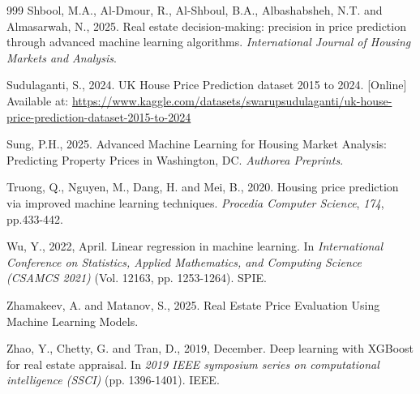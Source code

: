 \documentclass[12pt, a4paper, oneside]{book}
\begin{document}
\begin{thebibliography}{999}
Shbool, M.A., Al-Dmour, R., Al-Shboul, B.A., Albashabsheh, N.T. and Almasarwah, N., 2025. Real estate decision-making: precision in price prediction through advanced machine learning algorithms. \emph{International Journal of Housing Markets and Analysis}.

Sudulaganti, S., 2024. UK House Price Prediction dataset 2015 to 2024. [Online] Available at: \url{https://www.kaggle.com/datasets/swarupsudulaganti/uk-house-price-prediction-dataset-2015-to-2024}

Sung, P.H., 2025. Advanced Machine Learning for Housing Market Analysis: Predicting Property Prices in Washington, DC. \emph{Authorea Preprints}.

Truong, Q., Nguyen, M., Dang, H. and Mei, B., 2020. Housing price prediction via improved machine learning techniques. \emph{Procedia Computer Science}, \emph{174}, pp.433-442.

Wu, Y., 2022, April. Linear regression in machine learning. In \emph{International Conference on Statistics, Applied Mathematics, and Computing Science (CSAMCS 2021)} (Vol. 12163, pp. 1253-1264). SPIE.

Zhamakeev, A. and Matanov, S., 2025. Real Estate Price Evaluation Using Machine Learning Models.

Zhao, Y., Chetty, G. and Tran, D., 2019, December. Deep learning with XGBoost for real estate appraisal. In \emph{2019 IEEE symposium series on computational intelligence (SSCI)} (pp. 1396-1401). IEEE.

\end{thebibliography}
\end{document}
